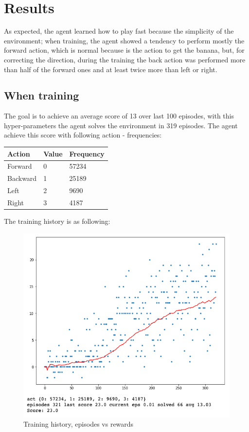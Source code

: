 \documentclass{article}
\begin{document}
\section{Results}
As expected, the agent learned how to play fast because the simplicity of the environment; when training, the agent showed a tendency to perform mostly the forward action, which is normal because is the action to get the banana, but, for correcting the direction, during the training the back action was performed more than half of the forward ones and at least twice more than left or right.
\subsection{When training}
The goal is to achieve an average score of 13 over last 100 episodes, with this hyper-parameters the agent solves the environment in 319 episodes.\newline
The agent achieve this score with following action - frequencies:
\begin{table}[!htbp] 
\center
\begin{tabular}{l|l|l}
Action         & Value & Frequency\\
\hline
Forward       & 0 & 57234 \\
Backward      & 1 & 25189 \\
Left 	      & 2 &  9690\\
Right 	      & 3 &	 4187
\end{tabular}
\end{table}
\newline The training history is as following:
\begin{figure}[!htbp]
\centering
\includegraphics[scale=0.3]{training}
\caption{Training history, episodes vs rewards}
\label{fig:traiming}
\end{figure}
\end{document}
